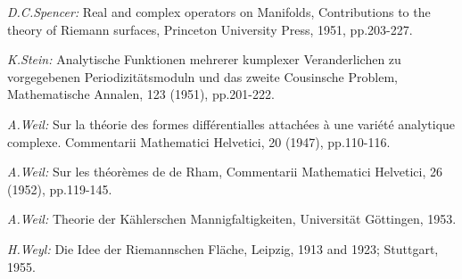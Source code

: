 \begin{thebibliography}{99}
 {\em D.\@ C.\@ Spencer:} Real and complex operators on
  Manifolds, Contributions to the theory of Riemann surfaces,
  Princeton University Press, 1951, pp.\@ 203-227.

 {\em K.\@ Stein:} Analytische Funktionen mehrerer
  kumplexer Veranderlichen zu vorgegebenen Periodizit\"atsmoduln und
  das zweite Cousinsche Problem, Mathematische Annalen, 123 (1951),
  pp.\@ 201-222.

 {\em A.\@ Weil:} Sur la th\'eorie des formes
  diff\'erentialles attach\'ees \`a une vari\'et\'e analytique
  complexe. Commentarii Mathematici Helvetici, 20 (1947), pp.\@ 110-116.

 {\em A.\@ Weil:} Sur les th\'eor\`emes de de Rham,
  Commentarii Mathematici Helvetici, 26 (1952), pp.\@ 119-145.

 {\em A.\@ Weil:} Theorie der K\"ahlerschen
  Mannigfaltigkeiten, Universit\"at G\"ottingen, 1953.

 {\em H.\@ Weyl:} Die Idee der Riemannschen Fl\"ache,
  Leipzig, 1913 and 1923; Stuttgart, 1955.

\end{thebibliography}
